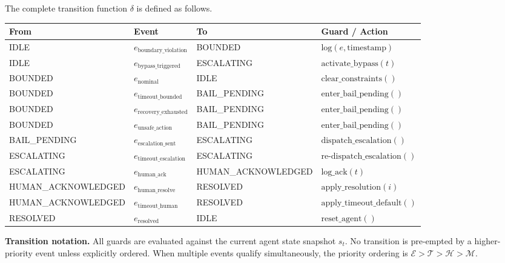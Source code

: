 \bigskip

The complete transition function $\delta$ is defined as follows.

\begin{center}
\begin{tabular}{|p{3.5cm}|p{3.5cm}|p{2.5cm}|p{4cm}|}
\hline
\textbf{From} & \textbf{Event} & \textbf{To} & \textbf{Guard / Action} \\ \hline
IDLE & $e_\text{boundary\_violation}$ & BOUNDED & $\text{log}(e, \text{timestamp})$ \\ \hline
IDLE & $e_\text{bypass\_triggered}$ & ESCALATING & $\text{activate\_bypass}(t)$ \\ \hline
BOUNDED & $e_\text{nominal}$ & IDLE & $\text{clear\_constraints}()$ \\ \hline
BOUNDED & $e_\text{timeout\_bounded}$ & BAIL\_PENDING & $\text{enter\_bail\_pending}()$ \\ \hline
BOUNDED & $e_\text{recovery\_exhausted}$ & BAIL\_PENDING & $\text{enter\_bail\_pending}()$ \\ \hline
BOUNDED & $e_\text{unsafe\_action}$ & BAIL\_PENDING & $\text{enter\_bail\_pending}()$ \\ \hline
BAIL\_PENDING & $e_\text{escalation\_sent}$ & ESCALATING & $\text{dispatch\_escalation}()$ \\ \hline
ESCALATING & $e_\text{timeout\_escalation}$ & ESCALATING & $\text{re-dispatch\_escalation}()$ \\ \hline
ESCALATING & $e_\text{human\_ack}$ & HUMAN\_ACKNOWLEDGED & $\text{log\_ack}(t)$ \\ \hline
HUMAN\_ACKNOWLEDGED & $e_\text{human\_resolve}$ & RESOLVED & $\text{apply\_resolution}(i)$ \\ \hline
HUMAN\_ACKNOWLEDGED & $e_\text{timeout\_human}$ & RESOLVED & $\text{apply\_timeout\_default}()$ \\ \hline
RESOLVED & $e_\text{resolved}$ & IDLE & $\text{reset\_agent}()$ \\ \hline
\end{tabular}
\end{center}

\bigskip

\noindent\textbf{Transition notation.}  All guards are evaluated against the
current agent state snapshot $s_t$.  No transition is pre-empted by a higher-priority
event unless explicitly ordered.  When multiple events qualify simultaneously,
the priority ordering is $\mathcal{E} > \mathcal{T} > \mathcal{H} > \mathcal{M}$.

